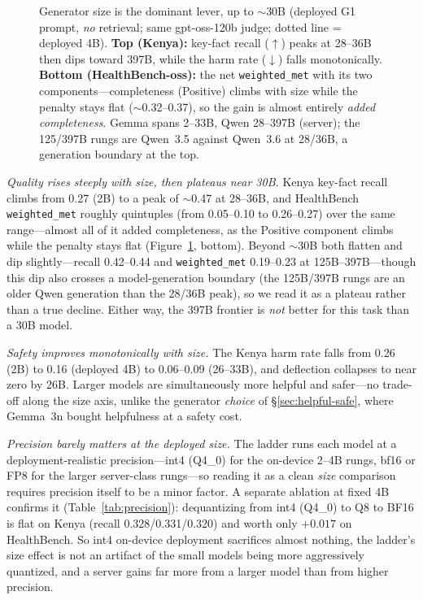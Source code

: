 \begin{figure}[tb]
\caption{Generator size is the dominant lever, up to $\sim$30B (deployed G1
prompt, \emph{no} retrieval; same gpt-oss-120b judge; dotted line = deployed
4B). \textbf{Top (Kenya):} key-fact recall ($\uparrow$) peaks at 28--36B then
dips toward 397B, while the harm rate ($\downarrow$) falls monotonically.
\textbf{Bottom (HealthBench-oss):} the net \texttt{weighted\_met} with its two
components---completeness (Positive) climbs with size while the penalty stays
flat ($\sim$0.32--0.37), so the gain is almost entirely \emph{added
completeness}. Gemma spans 2--33B, Qwen 28--397B (server); the 125/397B rungs
are Qwen~3.5 against Qwen~3.6 at 28/36B, a generation boundary at the top.}
\label{fig:size-ladder}
\end{figure}

\emph{Quality rises steeply with size, then plateaus near 30B.} Kenya
key-fact recall climbs from 0.27 (2B) to a peak of $\sim$0.47 at 28--36B, and
HealthBench \texttt{weighted\_met} roughly quintuples (from 0.05--0.10 to
0.26--0.27) over the same range---almost all of it added completeness, as the
Positive component climbs while the penalty stays flat
(Figure~\ref{fig:size-ladder}, bottom). Beyond $\sim$30B both flatten and
dip slightly---recall 0.42--0.44 and \texttt{weighted\_met} 0.19--0.23 at
125B--397B---though this dip also crosses a model-generation boundary (the
125B/397B rungs are an older Qwen generation than the 28/36B peak), so we read
it as a plateau rather than a true decline. Either way, the 397B frontier is
\emph{not} better for this task than a 30B model.

\emph{Safety improves monotonically with size.} The Kenya harm rate falls from
0.26 (2B) to 0.16 (deployed 4B) to 0.06--0.09 (26--33B), and deflection
collapses to near zero by 26B. Larger models are simultaneously more helpful
and safer---no trade-off along the size axis, unlike the generator
\emph{choice} of \S\ref{sec:helpful-safe}, where Gemma~3n bought helpfulness at
a safety cost.

\emph{Precision barely matters at the deployed size.} The ladder runs each
model at a deployment-realistic precision---int4 (Q4\_0) for the on-device
2--4B rungs, bf16 or FP8 for the larger server-class rungs---so reading it as
a clean \emph{size} comparison requires precision itself to be a minor factor.
A separate ablation at fixed 4B confirms it (Table~\ref{tab:precision}):
dequantizing from int4 (Q4\_0) to Q8 to BF16 is flat on Kenya (recall
0.328/0.331/0.320) and worth only $+0.017$ on HealthBench. So int4 on-device
deployment sacrifices almost nothing, the ladder's size effect is not an
artifact of the small models being more aggressively quantized, and a server
gains far more from a larger model than from higher precision.

